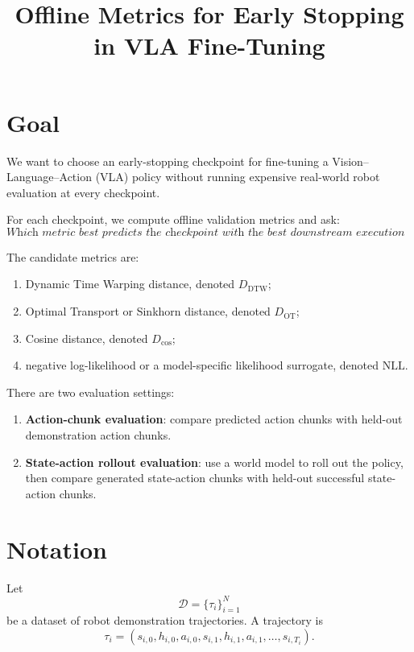 \documentclass[11pt]{article}
\title{Offline Metrics for Early Stopping in VLA Fine-Tuning}
\author{}
\date{}
\begin{document}
\maketitle

\section{Goal}

We want to choose an early-stopping checkpoint for fine-tuning a Vision--Language--Action (VLA) policy without running expensive real-world robot evaluation at every checkpoint.

For each checkpoint, we compute offline validation metrics and ask:
\begin{equation}
\textit{Which metric best predicts the checkpoint with the best downstream execution quality?}
\end{equation}

The candidate metrics are:
\begin{enumerate}
    \item Dynamic Time Warping distance, denoted $D_{\mathrm{DTW}}$;
    \item Optimal Transport or Sinkhorn distance, denoted $D_{\mathrm{OT}}$;
    \item Cosine distance, denoted $D_{\mathrm{cos}}$;
    \item negative log-likelihood or a model-specific likelihood surrogate, denoted $\mathrm{NLL}$.
\end{enumerate}

There are two evaluation settings:
\begin{enumerate}
    \item \textbf{Action-chunk evaluation}: compare predicted action chunks with held-out demonstration action chunks.
    \item \textbf{State-action rollout evaluation}: use a world model to roll out the policy, then compare generated state-action chunks with held-out successful state-action chunks.
\end{enumerate}

\section{Notation}

Let
\begin{equation}
\mathcal{D}=\{\tau_i\}_{i=1}^{N}
\end{equation}
be a dataset of robot demonstration trajectories. A trajectory is
\begin{equation}
\tau_i = (s_{i,0},h_{i,0},a_{i,0},s_{i,1},h_{i,1},a_{i,1},\ldots,s_{i,T_i}).
\end{equation}
\end{document}
